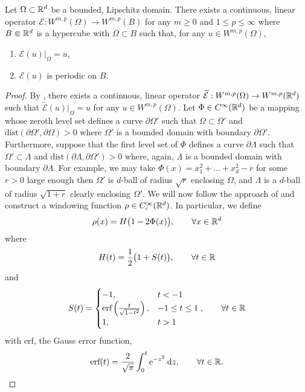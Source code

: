 \documentclass[reqno,a4paper]{amsart}
\begin{document}
\begin{lemma}
\label{lem:periodic_extension}
Let \(\Omega \subset \mathbb{R}^d\) be a bounded, Lipschitz domain. There exists a continuous, linear operator \(\mathcal{E} : W^{m,p}(\Omega) \to W^{m,p}(B)\) for any \(m \geq 0\) and \(1 \leq p \leq \infty\) where \(B \Subset \mathbb{R}^d\) is a hypercube with \(\Omega \subset B\)
such that, for any \(u \in W^{m,p}(\Omega)\),
\begin{enumerate}
	\item \(\mathcal{E}(u)|_\Omega = u\),
	\item \(\mathcal{E}(u)\) is periodic on \(B\).
\end{enumerate}
\end{lemma}
\begin{proof}
By \cite[Chapter 6, Theorem 5]{stein1970singular}, there exists a continuous, linear operator \(\widetilde{\mathcal{E}} : W^{m,p}(\Omega) \to W^{m,p}(\mathbb{R}^d)\)
such that \(\tilde{\mathcal{E}}(u)|_\Omega = u\) for any \(u \in W^{m,p}(\Omega)\). Let \(\Phi \in C^\infty(\mathbb{R}^d)\) be a mapping
whose zeroth level set defines a curve \(\partial \Omega '\) such that \(\Omega \subset \Omega'\) and \(\text{dist}(\partial \Omega',  \partial \Omega) > 0\)  where \(\Omega'\) is a bounded domain with boundary \(\partial \Omega'\). Furthermore, suppose that the 
first level set of \(\Phi\) defines a curve \(\partial \Lambda\) such that \(\Omega' \subset \Lambda\)
and \(\text{dist}(\partial \Lambda,  \partial \Omega') > 0\)
where, again, \(\Lambda\) is a bounded domain with boundary \(\partial \Lambda\).
For example, we may take \(\Phi(x) = x_1^2 + \dots + x_d^2 - r\) for some \(r > 0\) large enough then \(\Omega'\) is \(d\)-ball of radius \(\sqrt{r}\) enclosing \(\Omega\), and \(\Lambda\) is a \(d\)-ball of radius \(\sqrt{1+r}\) clearly enclosing \(\Omega'\). We will now follow 
the approach of \cite{boyd2005fourier} and construct a windowing function \(\rho \in C^\infty_c (\mathbb{R}^d)\). In particular, we
define
\[\rho(x) = H \bigl ( 1 - 2 \Phi(x) \bigl ), \qquad \forall x \in \mathbb{R}^d\]
where 
\[H(t) = \frac{1}{2} \bigl (1 + S(t) \bigl ), \qquad \forall t \in \mathbb{R}\]
and 
\[
S(t) = \begin{cases}
-1, & t < -1 \\
\text{erf}\left( \frac{t}{\sqrt{1-t^2}} \right), & -1 \leq t \leq 1\\
1, & t > 1
\end{cases}, \qquad \forall t \in \mathbb{R}
\]
with \(\text{erf}\), the Gauss error function,
\[\text{erf}(t) = \frac{2}{\sqrt{\pi}} \int_0^t \text{e}^{-z^2} \: \text{d}z, \qquad \forall t \in \mathbb{R}.\]

\end{proof}
\end{document}
